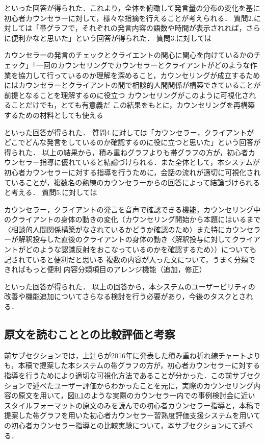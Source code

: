 \documentclass[shuuron]{kuee}
\begin{document}
といった回答が得られた．これより，全体を俯瞰して発言量の分布の変化を基に初心者カウンセラーに対して，様々な指摘を行えることが考えられる．
質問2.に対しては「帯グラフで，それぞれの発言内容の語数や時間が表示されれば，さらに便利かなと思いた」という回答が得られた．
質問3.に対しては

  カウンセラーの発言のチェックとクライエントの関心に関心を向けているかのチェック」「一回のカウンセリングでカウンセラーとクライアントがどのような作業を協力して行っているのか理解を深めること，カウンセリングが成立するためにはカウンセラーとクライアントの間で相談的人間関係が構築できていることが前提となることを理解するのに役立つ
  カウンセリングがこのように可視化されることだけでも，とても有意義だ
  この結果をもとに，カウンセリングを再構築するための材料としても使える

といった回答が得られた．
質問4.に対しては「カウンセラー，クライアントがどこでどんな発言をしているのか確認するのに役に立つと思いた」という回答が得られた．
以上の結果から，積み重ねグラフよりも帯グラフの方が，初心者カウンセラー指導に優れていると結論づけられる．また全体として，本システムが初心者カウンセラーに対する指導を行うために，会話の流れが適切に可視化されていることが，複数名の熟練のカウンセラーからの回答によって結論づけられると考える．
質問5.に対しては

  カウンセラー，クライアントの発言を音声で確認できる機能，カウンセリング中のクライアントの身体の動きの変化（カウンセリング開始から本題にはいるまで〈相談的人間関係構築がなされているかどうか確認のため〉また特にカウンセラーが解釈投与した直後のクライアントの身体の動き〈解釈投与に対してクライアントがどのような認識反射をおこなっているのかを確認するため〉）についても記されていると便利だと思いる
  複数の内容が入った文について，うまく分類できればもっと便利
  内容分類項目のアレンジ機能（追加，修正）



といった回答が得られた．
以上の回答から，本システムのユーザービリティの改善や機能追加についてさらなる検討を行う必要があり，今後のタスクとされる．

\subsection{原文を読むこととの比較評価と考察}%




前サブセクションでは，上辻ら\cite{uetsuji}が2016年に発表した積み重ね折れ線チャートよりも，本稿で提案した本システムの帯グラフの方が，初心者カウンセラーに対する指導を行うためにより適切な可視化方法であることが分かった．この前サブセクションで述べたユーザー評価からわかったことを元に，実際のカウンセリング内容の原文を用いて，図\ref{}のような実際のカウンセラー内での事例検討会に近いスタイルフォーマットの原文のみを読んでの初心者カウンセラー指導と，本稿で提案した帯グラフを用いた初心者カウンセラー習熟度評価支援システムを用いての初心者カウンセラー指導との比較実験について，本サブセクションにて述べる．
\end{document}
